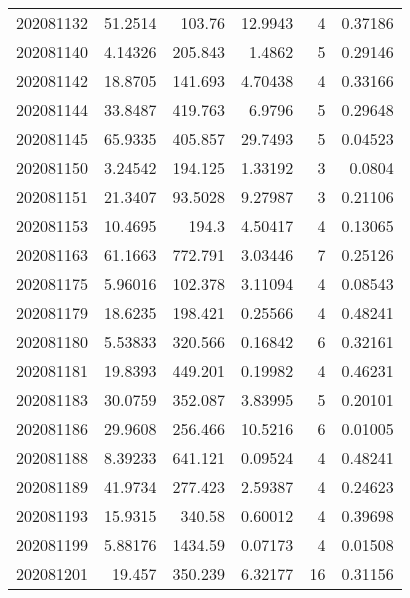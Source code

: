 \begin{tabular}{rrrrrr}
 202081132 &         51.2514  &      103.76   &           12.9943  &           4 & 0.37186 \\
 202081140 &          4.14326 &      205.843  &            1.4862  &           5 & 0.29146 \\
 202081142 &         18.8705  &      141.693  &            4.70438 &           4 & 0.33166 \\
 202081144 &         33.8487  &      419.763  &            6.9796  &           5 & 0.29648 \\
 202081145 &         65.9335  &      405.857  &           29.7493  &           5 & 0.04523 \\
 202081150 &          3.24542 &      194.125  &            1.33192 &           3 & 0.0804  \\
 202081151 &         21.3407  &       93.5028 &            9.27987 &           3 & 0.21106 \\
 202081153 &         10.4695  &      194.3    &            4.50417 &           4 & 0.13065 \\
 202081163 &         61.1663  &      772.791  &            3.03446 &           7 & 0.25126 \\
 202081175 &          5.96016 &      102.378  &            3.11094 &           4 & 0.08543 \\
 202081179 &         18.6235  &      198.421  &            0.25566 &           4 & 0.48241 \\
 202081180 &          5.53833 &      320.566  &            0.16842 &           6 & 0.32161 \\
 202081181 &         19.8393  &      449.201  &            0.19982 &           4 & 0.46231 \\
 202081183 &         30.0759  &      352.087  &            3.83995 &           5 & 0.20101 \\
 202081186 &         29.9608  &      256.466  &           10.5216  &           6 & 0.01005 \\
 202081188 &          8.39233 &      641.121  &            0.09524 &           4 & 0.48241 \\
 202081189 &         41.9734  &      277.423  &            2.59387 &           4 & 0.24623 \\
 202081193 &         15.9315  &      340.58   &            0.60012 &           4 & 0.39698 \\
 202081199 &          5.88176 &     1434.59   &            0.07173 &           4 & 0.01508 \\
 202081201 &         19.457   &      350.239  &            6.32177 &          16 & 0.31156 \\

\end{tabular}
